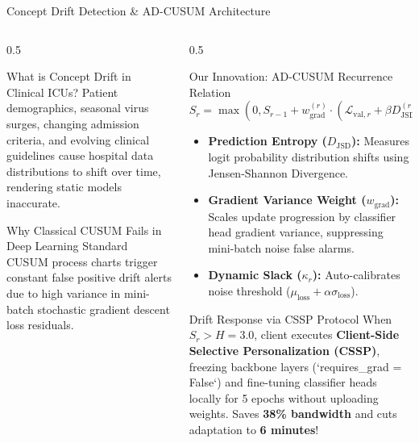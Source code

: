 \documentclass[aspectratio=169, 11pt]{beamer}
\begin{document}
\begin{frame}{Concept Drift Detection \& AD-CUSUM Architecture}
    \begin{columns}[t]
        \begin{column}{0.5\textwidth}
            \begin{block}{What is Concept Drift in Clinical ICUs?}
                \scriptsize
                Patient demographics, seasonal virus surges, changing admission criteria, and evolving clinical guidelines cause hospital data distributions to shift over time, rendering static models inaccurate.
            \end{block}
            
            \begin{block}{Why Classical CUSUM Fails in Deep Learning}
                \scriptsize
                Standard CUSUM process charts trigger constant false positive drift alerts due to high variance in mini-batch stochastic gradient descent loss residuals.
            \end{block}
        \end{column}
        
        \begin{column}{0.5\textwidth}
            \begin{alertblock}{Our Innovation: AD-CUSUM Recurrence Relation}
                \scriptsize
                \[ S_r = \max\left(0, S_{r-1} + w_{\text{grad}}^{(r)} \cdot \left(\mathcal{L}_{\text{val}, r} + \beta D_{\text{JSD}}^{(r)} - \kappa_r\right)\right) \]
                \begin{itemize}
                    \scriptsize
                    \item \textbf{Prediction Entropy ($D_{\text{JSD}}$):} Measures logit probability distribution shifts using Jensen-Shannon Divergence.
                    \item \textbf{Gradient Variance Weight ($w_{\text{grad}}$):} Scales update progression by classifier head gradient variance, suppressing mini-batch noise false alarms.
                    \item \textbf{Dynamic Slack ($\kappa_r$):} Auto-calibrates noise threshold ($\mu_{\text{loss}} + \alpha \sigma_{\text{loss}}$).
                \end{itemize}
            \end{alertblock}
            
            \begin{block}{Drift Response via CSSP Protocol}
                \scriptsize
                When $S_r > H=3.0$, client executes \textbf{Client-Side Selective Personalization (CSSP)}, freezing backbone layers (`requires\_grad = False`) and fine-tuning classifier heads locally for 5 epochs without uploading weights. Saves \textbf{38\% bandwidth} and cuts adaptation to \textbf{6 minutes}!
            \end{block}
        \end{column}
    \end{columns}
\end{frame}
\end{document}
